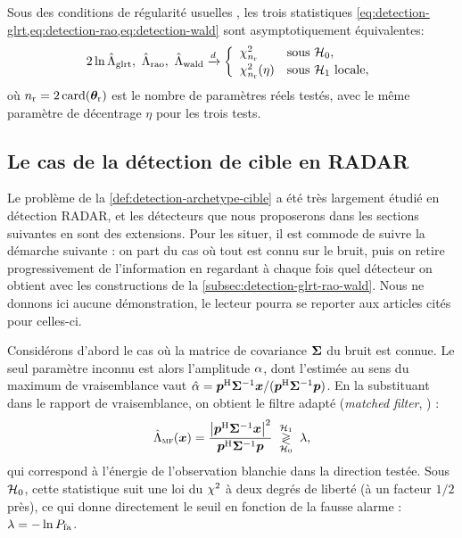 \begin{proposition}
\label{prop:detection-equivalence}
  Sous des conditions de régularité usuelles , les trois statistiques \cref{eq:detection-glrt,eq:detection-rao,eq:detection-wald} sont asymptotiquement équivalentes:
  \begin{equation}
    2\ln\hat{\Lambda}_{\mathrm{glrt}},\ \hat{\Lambda}_{\mathrm{rao}},\ \hat{\Lambda}_{\mathrm{wald}}
    \xrightarrow{d}
    \left\{
      \begin{array}{ll}
        \chi^2_{n_{\mathrm{r}}} & \text{sous } \mathcal{H}_0, \\[2pt]
        \chi^2_{n_{\mathrm{r}}}(\eta) & \text{sous } \mathcal{H}_1 \text{ locale},
      \end{array}
    \right.
    \label{eq:detection-equivalence}
  \end{equation}
  où $n_{\mathrm{r}}=2\,\mathrm{card}(\boldsymbol{\theta}_{\mathrm{r}})$ est le nombre de paramètres réels testés, avec le même paramètre de décentrage $\eta$ pour les trois tests. 
\end{proposition}


\subsection{Le cas de la détection de cible en RADAR}
\label{subsec:detection radar}

Le problème de la \cref{def:detection-archetype-cible} a été très largement étudié en détection RADAR, et les détecteurs que nous proposerons dans les sections suivantes en sont des extensions. Pour les situer, il est commode de suivre la démarche suivante : on part du cas où tout est connu sur le bruit, puis on retire progressivement de l'information en regardant à chaque fois quel détecteur on obtient avec les constructions de la \cref{subsec:detection-glrt-rao-wald}. Nous ne donnons ici aucune démonstration, le lecteur pourra se reporter aux articles cités pour celles-ci.

Considérons d'abord le cas où la matrice de covariance $\boldsymbol{\Sigma}$ du bruit est connue. Le seul paramètre inconnu est alors l'amplitude $\alpha$, dont l'estimée au sens du maximum de vraisemblance vaut $\hat{\alpha}=\boldsymbol{p}^{\mathrm{H}}{\boldsymbol{\Sigma}}^{-1}\boldsymbol{x}/(\boldsymbol{p}^{\mathrm{H}}{\boldsymbol{\Sigma}}^{-1}\boldsymbol{p})$. En la substituant dans le rapport de vraisemblance, on obtient le filtre adapté (\emph{matched filter}, ) :
\begin{equation}
  \hat{\Lambda}_{\textsc{mf}}(\boldsymbol{x})
  =
  \frac{\left\lvert\boldsymbol{p}^{\mathrm{H}}{\boldsymbol{\Sigma}}^{-1}\boldsymbol{x}\right\rvert^2}{\boldsymbol{p}^{\mathrm{H}}{\boldsymbol{\Sigma}}^{-1}\boldsymbol{p}}
  \;\underset{\mathcal{H}_0}{\overset{\mathcal{H}_1}{\gtrless}}\; \lambda,
  \label{eq:detection-mf}
\end{equation}
qui correspond à l'énergie de l'observation blanchie dans la direction testée. Sous $\mathcal{H}_0$, cette statistique suit une loi du $\chi^2$ à deux degrés de liberté (à un facteur $1/2$ près), ce qui donne directement le seuil en fonction de la fausse alarme : $\lambda=-\ln P_{\mathrm{fa}}$.

